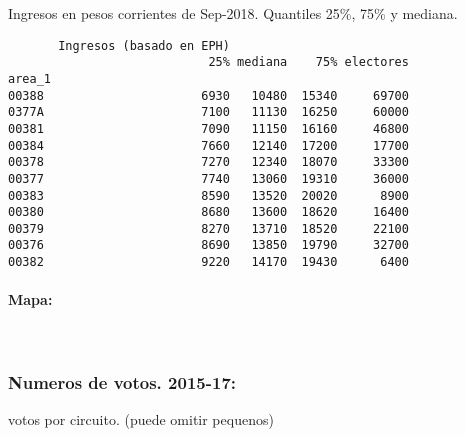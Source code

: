 \documentclass[11pt]{article}
\begin{document}
    
    Ingresos en pesos corrientes de Sep-2018. Quantiles 25\%, 75\% y
mediana.

    
    
    \begin{verbatim}
       Ingresos (basado en EPH)                         
                            25% mediana    75% electores
area_1                                                  
00388                      6930   10480  15340     69700
0377A                      7100   11130  16250     60000
00381                      7090   11150  16160     46800
00384                      7660   12140  17200     17700
00378                      7270   12340  18070     33300
00377                      7740   13060  19310     36000
00383                      8590   13520  20020      8900
00380                      8680   13600  18620     16400
00379                      8270   13710  18520     22100
00376                      8690   13850  19790     32700
00382                      9220   14170  19430      6400
    \end{verbatim}

    
    \hypertarget{mapa}{%
\paragraph{Mapa:}\label{mapa}}

    
    \begin{center}
    \end{center}
    { \hspace*{\fill} \\}
    
    \hypertarget{numeros-de-votos.-2015-17}{%
\subsubsection{Numeros de votos.
2015-17:}\label{numeros-de-votos.-2015-17}}

    
    votos por circuito. (puede omitir pequenos)

    
    
\end{document}
